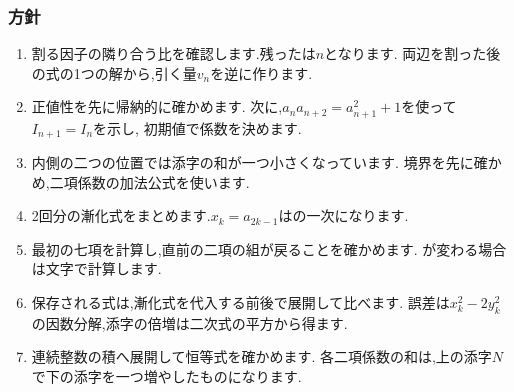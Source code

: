 \subsubsection{方針}
\begin{enumerate}[label=\textbf{問\arabic*.},format=\bookitemlink{practice-connections}{hint}{answer}]
  \item 割る因子の隣り合う比を確認します.残ったは$n$となります.
    両辺を割った後の式の1つの解から,引く量$v_n$を逆に作ります.
  \item 正値性を先に帰納的に確かめます.
    次に,$a_na_{n+2}=a_{n+1}^2+1$を使って$I_{n+1}=I_n$を示し,
    初期値で係数を決めます.
  \item 内側の二つの位置では添字の和が一つ小さくなっています.
    境界を先に確かめ,二項係数の加法公式を使います.
  \item 2回分の漸化式をまとめます.$x_k=a_{2k-1}$はの一次になります.
  \item 最初の七項を計算し,直前の二項の組が戻ることを確かめます.
    が変わる場合は文字で計算します.
  \item 保存される式は,漸化式を代入する前後で展開して比べます.
    誤差は$x_k^2-2y_k^2$の因数分解,添字の倍増は二次式の平方から得ます.
  \item 連続整数の積へ展開して恒等式を確かめます.
    各二項係数の和は,上の添字$N$で下の添字を一つ増やしたものになります.
\end{enumerate}

